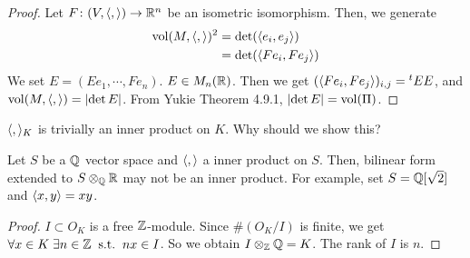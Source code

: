 \begin{proof}
  Let $F \colon (V, \langle , \rangle) \to {\mathbb R}^n$ be  an isometric isomorphism. Then, we generate
  \begin{align*}
    \operatorname{vol} (M, \langle , \rangle )^2 &= \det (\langle e_i,e_j \rangle) \\
    &= \det (\langle Fe_i,Fe_j \rangle)
  \end{align*}
  We set $E = (Ee_1, \cdots, Fe_n)$. $E \in M_n({\mathbb R})$. Then we get $( \langle Fe_i,Fe_j \rangle)_{i,j} = {}^tE E$, and $\operatorname{vol} (M, \langle , \rangle ) = \left \lvert \det E  \right \rvert$. From Yukie\cite{雪江線形} Theorem 4.9.1, $\left \lvert \det E  \right \rvert = \operatorname{vol}(\Pi)$.
\end{proof}



\begin{rem}
  $\langle , \rangle_K$ is trivially an inner product on $K$. Why should we show this?

  Let $S$ be a ${\mathbb Q}$ vector space and $\langle , \rangle$ a inner product on $S$. Then, bilinear form extended to $S \otimes_{{\mathbb Q}} {\mathbb R}$ may not be an inner product. For example, set $S = {\mathbb Q}[\sqrt{2}]$ and $\langle x,y \rangle = xy$.
\end{rem}



\begin{proof}
  $I \subset O_K$ is a free ${\mathbb Z}$-module. Since $\# (O_K/I)$ is finite, we get $\forall x \in K \; \exists n \in {\mathbb Z} \; \; \text{s.t.} \; \; nx \in I$. So we obtain $I \otimes_{{\mathbb Z}} {\mathbb Q} = K$. The rank of $I$ is $n$.
\end{proof}

